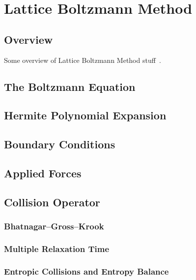 \documentclass{article}
\begin{document}
\section{Lattice Boltzmann Method}

\subsection{Overview}

Some overview of Lattice Boltzmann Method stuff~\cite{grasinger2015simulation}.

\subsection{The Boltzmann Equation}

\subsection{Hermite Polynomial Expansion}

\subsection{Boundary Conditions}

\subsection{Applied Forces}

\subsection{Collision Operator} %

\subsubsection{Bhatnagar--Gross--Krook}

\subsubsection{Multiple Relaxation Time}

\subsubsection{Entropic Collisions and Entropy Balance}
\end{document}
